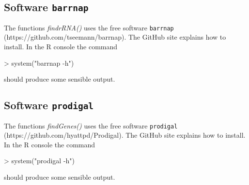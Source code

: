 \documentclass{article}
\begin{document}
\subsection{Software \texttt{barrnap}}
The functions \emph{findrRNA()} uses the free software \texttt{barrnap} (https://github.com/tseemann/barrnap). The GitHub site explains how to install. In the R console the command
\begin{Schunk}
\begin{Sinput}
> system("barrnap -h")
\end{Sinput}
\end{Schunk}
should produce some sensible output.


\subsection{Software \texttt{prodigal}}
The functions \emph{findGenes()} uses the free software \texttt{prodigal} (https://github.com/hyattpd/Prodigal). The GitHub site explains how to install. In the R console the command
\begin{Schunk}
\begin{Sinput}
> system("prodigal -h")
\end{Sinput}
\end{Schunk}
should produce some sensible output.
\end{document}
